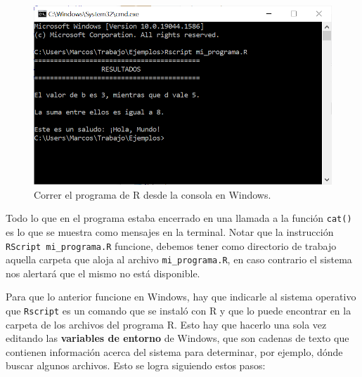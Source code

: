 \documentclass[
]{book}
\begin{document}
\begin{figure}

{\centering \includegraphics[width=0.8\linewidth]{images/07_otros/terminal7} 

}

\caption{Correr el programa de R desde la consola en Windows.}\label{fig:unnamed-chunk-182}
\end{figure}

Todo lo que en el programa estaba encerrado en una llamada a la función \texttt{cat()} es lo que se muestra como mensajes en la terminal. Notar que la instrucción \texttt{RScript\ mi\_programa.R} funcione, debemos tener como directorio de trabajo aquella carpeta que aloja al archivo \texttt{mi\_programa.R}, en caso contrario el sistema nos alertará que el mismo no está disponible.

Para que lo anterior funcione en Windows, hay que indicarle al sistema operativo que \texttt{Rscript} es un comando que se instaló con R y que lo puede encontrar en la carpeta de los archivos del programa R. Esto hay que hacerlo una sola vez editando las \textbf{variables de entorno} de Windows, que son cadenas de texto que contienen información acerca del sistema para determinar, por ejemplo, dónde buscar algunos archivos. Esto se logra siguiendo estos pasos:
\end{document}
